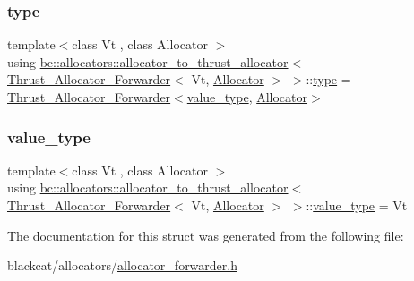 \subsubsection{\texorpdfstring{type}{type}}
{\footnotesize\ttfamily template$<$class Vt , class Allocator $>$ \\
using \hyperlink{structbc_1_1allocators_1_1allocator__to__thrust__allocator}{bc\+::allocators\+::allocator\+\_\+to\+\_\+thrust\+\_\+allocator}$<$ \hyperlink{structbc_1_1allocators_1_1Thrust__Allocator__Forwarder}{Thrust\+\_\+\+Allocator\+\_\+\+Forwarder}$<$ Vt, \hyperlink{classbc_1_1allocators_1_1Allocator}{Allocator} $>$ $>$\+::\hyperlink{structbc_1_1allocators_1_1allocator__to__thrust__allocator_3_01Thrust__Allocator__Forwarder_3_01Vt_00_01Allocator_01_4_01_4_aab258637b8cbf8780f151b30be13bcbe}{type} =  \hyperlink{structbc_1_1allocators_1_1Thrust__Allocator__Forwarder}{Thrust\+\_\+\+Allocator\+\_\+\+Forwarder}$<$\hyperlink{structbc_1_1allocators_1_1allocator__to__thrust__allocator_3_01Thrust__Allocator__Forwarder_3_01Vt_00_01Allocator_01_4_01_4_ab69955d1422c491409858fb5dc9076cb}{value\+\_\+type}, \hyperlink{classbc_1_1allocators_1_1Allocator}{Allocator}$>$}

\mbox{\label{structbc_1_1allocators_1_1allocator__to__thrust__allocator_3_01Thrust__Allocator__Forwarder_3_01Vt_00_01Allocator_01_4_01_4_ab69955d1422c491409858fb5dc9076cb}} 
\subsubsection{\texorpdfstring{value\+\_\+type}{value\_type}}
{\footnotesize\ttfamily template$<$class Vt , class Allocator $>$ \\
using \hyperlink{structbc_1_1allocators_1_1allocator__to__thrust__allocator}{bc\+::allocators\+::allocator\+\_\+to\+\_\+thrust\+\_\+allocator}$<$ \hyperlink{structbc_1_1allocators_1_1Thrust__Allocator__Forwarder}{Thrust\+\_\+\+Allocator\+\_\+\+Forwarder}$<$ Vt, \hyperlink{classbc_1_1allocators_1_1Allocator}{Allocator} $>$ $>$\+::\hyperlink{structbc_1_1allocators_1_1allocator__to__thrust__allocator_3_01Thrust__Allocator__Forwarder_3_01Vt_00_01Allocator_01_4_01_4_ab69955d1422c491409858fb5dc9076cb}{value\+\_\+type} =  Vt}



The documentation for this struct was generated from the following file\+:\begin{DoxyCompactItemize}
\item 
blackcat/allocators/\hyperlink{allocator__forwarder_8h}{allocator\+\_\+forwarder.\+h}\end{DoxyCompactItemize}
